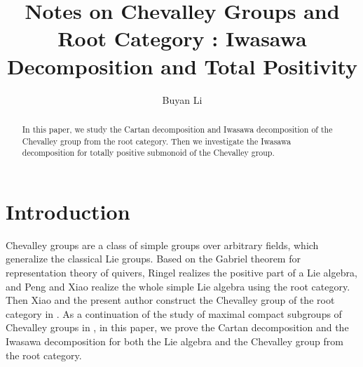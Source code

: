 \documentclass[12pt]{amsart}
\begin{document}
\onehalfspacing   %

\title[Iwasawa Decomposition and Total Positivity]
{Notes on Chevalley Groups and Root Category \uppercase\expandafter{}: Iwasawa Decomposition and Total Positivity}




\author[Buyan Li]{Buyan Li}
\address{Department of Mathematical Sciences, Tsinghua University, Beijing 100084, P. R. China}
















\maketitle



\begin{abstract}
In this paper, we study the Cartan decomposition and Iwasawa decomposition of the Chevalley group from the root category.
Then we investigate the Iwasawa decomposition for totally positive submonoid of the Chevalley group.
\end{abstract}

\setcounter{tocdepth}{1}\tableofcontents

\section{Introduction}
Chevalley groups are a class of simple groups over arbitrary fields, which generalize the classical Lie groups. 
Based on the Gabriel theorem for representation theory of quivers, Ringel \cite{RINGEL1990137} realizes the positive part of a Lie algebra, and Peng and Xiao \cite{1997ROOT} realize the whole simple Lie algebra using the root category.
Then Xiao and the present author construct the Chevalley group of the root category in \cite{notes1}.
As a continuation of the study of maximal compact subgroups of Chevalley groups in \cite{notes2}, in this paper, we prove the Cartan decomposition and the Iwasawa decomposition for both the Lie algebra and the Chevalley group from the root category.
\end{document}
